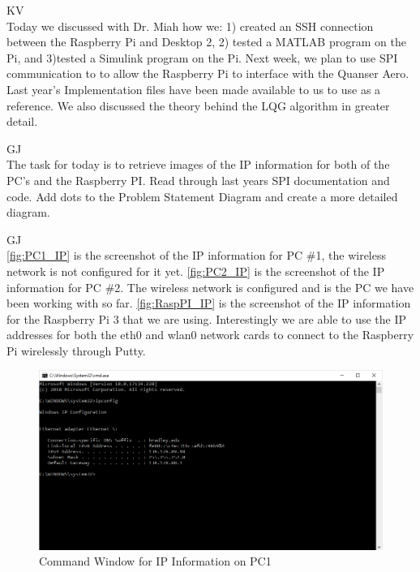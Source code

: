 \documentclass[fontsize=11pt, %
                             paper=letter, %
                             openany, %
                             captions=tableheading,
                             index=totoc,
                             hyperref]{labbook}
\begin{document}
\begin{addmargin}[0cm]{0cm}

KV\\
Today we discussed with Dr. Miah how we: 1) created an SSH connection between the Raspberry Pi and Desktop 2, 2) tested a MATLAB program on the Pi, and 3)tested a Simulink program on the Pi.  Next week, we plan to use SPI communication to to allow the Raspberry Pi to interface with the Quanser Aero.  Last year's Implementation files have been made available to us to use as a reference.  We also discussed the theory behind the LQG algorithm in greater detail.


GJ\\
The task for today is to retrieve images of the IP information for both of the PC's and the Raspberry PI.  Read through last years SPI documentation and code.  Add dots to the Problem Statement Diagram and create a more detailed diagram.

GJ\\
\autoref{fig:PC1_IP} is the screenshot of the IP information for PC \#1, the wireless network is not configured for it yet.  \autoref{fig:PC2_IP} is the screenshot of the IP information for PC \#2.  The wireless network is configured and is the PC we have been working with so far.  \autoref{fig:RaspPI_IP} is the screenshot of the IP information for the Raspberry Pi 3 that we are using.  Interestingly we are able to use the IP addresses for both the eth0 and wlan0 network cards to connect to the Raspberry Pi wirelessly through Putty.

\begin{figure}[H]
  \centering
  \includegraphics[width=1\textwidth]{figs/img/PC1_IP}
  \caption{Command Window for IP Information on PC1}
  \label{fig:PC1_IP}
\end{figure}


\end{addmargin}
\end{document}
